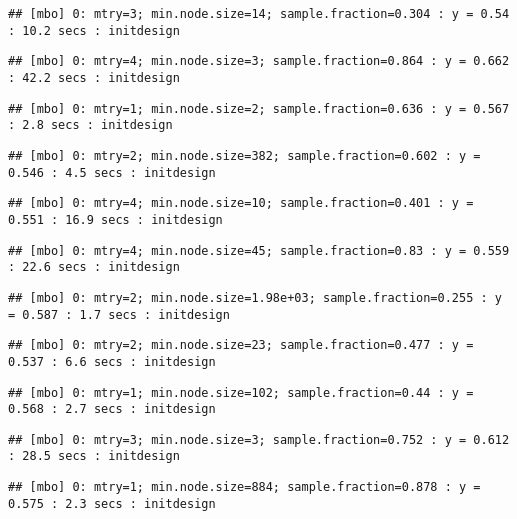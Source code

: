 \documentclass[
]{article}
\begin{document}
\begin{verbatim}
## [mbo] 0: mtry=3; min.node.size=14; sample.fraction=0.304 : y = 0.54 : 10.2 secs : initdesign
\end{verbatim}

\begin{verbatim}
## [mbo] 0: mtry=4; min.node.size=3; sample.fraction=0.864 : y = 0.662 : 42.2 secs : initdesign
\end{verbatim}

\begin{verbatim}
## [mbo] 0: mtry=1; min.node.size=2; sample.fraction=0.636 : y = 0.567 : 2.8 secs : initdesign
\end{verbatim}

\begin{verbatim}
## [mbo] 0: mtry=2; min.node.size=382; sample.fraction=0.602 : y = 0.546 : 4.5 secs : initdesign
\end{verbatim}

\begin{verbatim}
## [mbo] 0: mtry=4; min.node.size=10; sample.fraction=0.401 : y = 0.551 : 16.9 secs : initdesign
\end{verbatim}

\begin{verbatim}
## [mbo] 0: mtry=4; min.node.size=45; sample.fraction=0.83 : y = 0.559 : 22.6 secs : initdesign
\end{verbatim}

\begin{verbatim}
## [mbo] 0: mtry=2; min.node.size=1.98e+03; sample.fraction=0.255 : y = 0.587 : 1.7 secs : initdesign
\end{verbatim}

\begin{verbatim}
## [mbo] 0: mtry=2; min.node.size=23; sample.fraction=0.477 : y = 0.537 : 6.6 secs : initdesign
\end{verbatim}

\begin{verbatim}
## [mbo] 0: mtry=1; min.node.size=102; sample.fraction=0.44 : y = 0.568 : 2.7 secs : initdesign
\end{verbatim}

\begin{verbatim}
## [mbo] 0: mtry=3; min.node.size=3; sample.fraction=0.752 : y = 0.612 : 28.5 secs : initdesign
\end{verbatim}

\begin{verbatim}
## [mbo] 0: mtry=1; min.node.size=884; sample.fraction=0.878 : y = 0.575 : 2.3 secs : initdesign
\end{verbatim}
\end{document}
